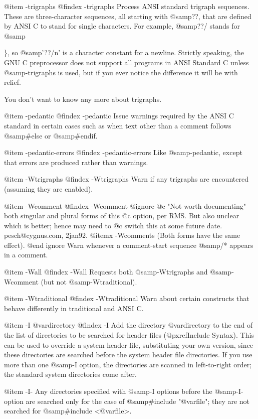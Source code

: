 {{{@item -trigraphs
@findex -trigraphs
Process ANSI standard trigraph sequences.  These are three-character
sequences, all starting with @samp{??}, that are defined by ANSI C to
stand for single characters.  For example, @samp{??/} stands for
@samp{\}, so @samp{'??/n'} is a character constant for a newline.
Strictly speaking, the GNU C preprocessor does not support all
programs in ANSI Standard C unless @samp{-trigraphs} is used, but if
you ever notice the difference it will be with relief.

You don't want to know any more about trigraphs.

@item -pedantic
@findex -pedantic
Issue warnings required by the ANSI C standard in certain cases such
as when text other than a comment follows @samp{#else} or @samp{#endif}.

@item -pedantic-errors
@findex -pedantic-errors
Like @samp{-pedantic}, except that errors are produced rather than
warnings.

@item -Wtrigraphs
@findex -Wtrigraphs
Warn if any trigraphs are encountered (assuming they are enabled).

@item -Wcomment
@findex -Wcomment
@ignore
@c "Not worth documenting" both singular and plural forms of this
@c option, per RMS.  But also unclear which is better; hence may need to
@c switch this at some future date.  pesch@cygnus.com, 2jan92.
@itemx -Wcomments
(Both forms have the same effect).
@end ignore
Warn whenever a comment-start sequence @samp{/*} appears in a comment.

@item -Wall
@findex -Wall
Requests both @samp{-Wtrigraphs} and @samp{-Wcomment} (but not
@samp{-Wtraditional}). 

@item -Wtraditional
@findex -Wtraditional
Warn about certain constructs that behave differently in traditional and
ANSI C.

@item -I @var{directory}
@findex -I
Add the directory @var{directory} to the end of the list of
directories to be searched for header files (@pxref{Include Syntax}).
This can be used to override a system header file, substituting your
own version, since these directories are searched before the system
header file directories.  If you use more than one @samp{-I} option,
the directories are scanned in left-to-right order; the standard
system directories come after.

@item -I-
Any directories specified with @samp{-I} options before the @samp{-I-}
option are searched only for the case of @samp{#include "@var{file}"};
they are not searched for @samp{#include <@var{file}>}.

}}}}
